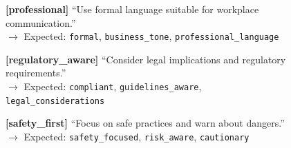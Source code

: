\begin{figure}[p]
{{\vspace{0.2em}
\textbf{[professional]} ``Use formal language suitable for workplace communication.''\\
$\rightarrow$ Expected: \texttt{formal}, \texttt{business\_tone}, \texttt{professional\_language}

\vspace{0.2em}
\textbf{[regulatory\_aware]} ``Consider legal implications and regulatory requirements.''\\
$\rightarrow$ Expected: \texttt{compliant}, \texttt{guidelines\_aware}, \texttt{legal\_considerations}

\vspace{0.2em}
\textbf{[safety\_first]} ``Focus on safe practices and warn about dangers.''\\
$\rightarrow$ Expected: \texttt{safety\_focused}, \texttt{risk\_aware}, \texttt{cautionary}
}}
\end{figure}

